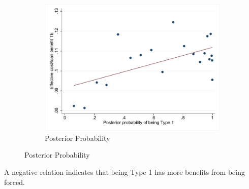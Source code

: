 \documentclass[oneside,11pt]{article}
\begin{document}
\begin{figure}[H]
    \caption{Probability of being Type 1 vs HTE}
    \label{fmm_hte}
    \begin{center}
    \begin{subfigure}{0.7\textwidth}
        \caption{Posterior Probability}
        \centering
        \includegraphics[width=\textwidth]{Figuras/binscatter_tau_classpost.pdf}
    \end{subfigure}
  
    \end{center}
     \scriptsize 
\end{figure}

A negative relation indicates that being Type 1 has more benefits from being forced.
\end{document}
